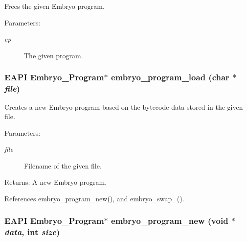 Frees the given Embryo program. 

\begin{Desc}
\item[Parameters:]
\begin{description}
\item[{\em ep}]The given program. \end{description}
\end{Desc}
\hypertarget{group__Embryo__Program__Creation__Group_g9ea38e9210de74c017facd957c0e1a9f}{
\subsubsection{\setlength{\rightskip}{0pt plus 5cm}EAPI Embryo\_\-Program$\ast$ embryo\_\-program\_\-load (char $\ast$ {\em file})}}
\label{group__Embryo__Program__Creation__Group_g9ea38e9210de74c017facd957c0e1a9f}


Creates a new Embryo program based on the bytecode data stored in the given file. 

\begin{Desc}
\item[Parameters:]
\begin{description}
\item[{\em file}]Filename of the given file. \end{description}
\end{Desc}
\begin{Desc}
\item[Returns:]A new Embryo program. \end{Desc}


References embryo\_\-program\_\-new(), and embryo\_\-swap\_().\hypertarget{group__Embryo__Program__Creation__Group_g235db2ba7ebad3eeb0b92bf8f5e6666e}{
\subsubsection{\setlength{\rightskip}{0pt plus 5cm}EAPI Embryo\_\-Program$\ast$ embryo\_\-program\_\-new (void $\ast$ {\em data}, \/  int {\em size})}}
\label{group__Embryo__Program__Creation__Group_g235db2ba7ebad3eeb0b92bf8f5e6666e}


